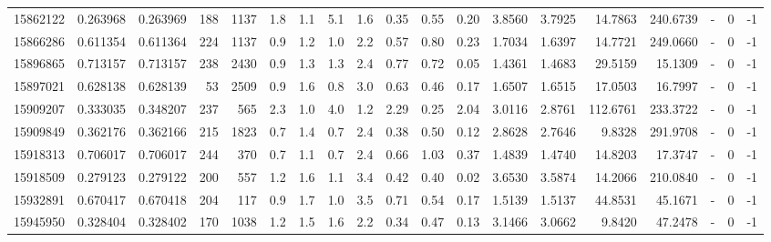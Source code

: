 \begin{tabular}{rrrrrrrrrrrrrrrrlrr}
  15862122 & 0.263968 &   0.263969 &  188 & 1137 &      1.8 &      1.1 &     5.1 &      1.6 &       0.35 &        0.55 &        0.20 &  3.8560 &  3.7925 &   14.7863 &  240.6739 &             - &        0 &         -1 \\
  15866286 & 0.611354 &   0.611364 &  224 & 1137 &      0.9 &      1.2 &     1.0 &      2.2 &       0.57 &        0.80 &        0.23 &  1.7034 &  1.6397 &   14.7721 &  249.0660 &             - &        0 &         -1 \\
  15896865 & 0.713157 &   0.713157 &  238 & 2430 &      0.9 &      1.3 &     1.3 &      2.4 &       0.77 &        0.72 &        0.05 &  1.4361 &  1.4683 &   29.5159 &   15.1309 &             - &        0 &         -1 \\
  15897021 & 0.628138 &   0.628139 &   53 & 2509 &      0.9 &      1.6 &     0.8 &      3.0 &       0.63 &        0.46 &        0.17 &  1.6507 &  1.6515 &   17.0503 &   16.7997 &             - &        0 &         -1 \\
  15909207 & 0.333035 &   0.348207 &  237 &  565 &      2.3 &      1.0 &     4.0 &      1.2 &       2.29 &        0.25 &        2.04 &  3.0116 &  2.8761 &  112.6761 &  233.3722 &             - &        0 &         -1 \\
  15909849 & 0.362176 &   0.362166 &  215 & 1823 &      0.7 &      1.4 &     0.7 &      2.4 &       0.38 &        0.50 &        0.12 &  2.8628 &  2.7646 &    9.8328 &  291.9708 &             - &        0 &         -1 \\
  15918313 & 0.706017 &   0.706017 &  244 &  370 &      0.7 &      1.1 &     0.7 &      2.4 &       0.66 &        1.03 &        0.37 &  1.4839 &  1.4740 &   14.8203 &   17.3747 &             - &        0 &         -1 \\
  15918509 & 0.279123 &   0.279122 &  200 &  557 &      1.2 &      1.6 &     1.1 &      3.4 &       0.42 &        0.40 &        0.02 &  3.6530 &  3.5874 &   14.2066 &  210.0840 &             - &        0 &         -1 \\
  15932891 & 0.670417 &   0.670418 &  204 &  117 &      0.9 &      1.7 &     1.0 &      3.5 &       0.71 &        0.54 &        0.17 &  1.5139 &  1.5137 &   44.8531 &   45.1671 &             - &        0 &         -1 \\
  15945950 & 0.328404 &   0.328402 &  170 & 1038 &      1.2 &      1.5 &     1.6 &      2.2 &       0.34 &        0.47 &        0.13 &  3.1466 &  3.0662 &    9.8420 &   47.2478 &             - &        0 &         -1 \\

\end{tabular}
